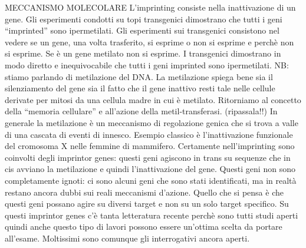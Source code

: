 \documentclass[11pt]{book}
\begin{document}
MECCANISMO MOLECOLARE
L’imprinting consiste nella inattivazione di un gene.
Gli esperimenti condotti su topi transgenici dimostrano che tutti i geni “imprinted” sono ipermetilati. Gli esperimenti sui transgenici consistono nel vedere se un gene, una volta trasferito, si esprime o non si esprime e perchè non si esprime. Se è un gene metilato non si esprime. I transgenici dimostrano in modo diretto e inequivocabile che tutti i geni imprinted sono ipermetilati.
NB: stiamo parlando di metilazione del DNA.
La metilazione spiega bene sia il silenziamento del gene sia il fatto che il gene inattivo resti tale nelle cellule derivate per mitosi da una cellula madre in cui è metilato. Ritorniamo al concetto della “memoria cellulare” e all’azione della metil-transferasi.  (ripassala!!)
In generale la metilazione è un meccanismo di regolazione genica che si trova a valle  di una cascata di eventi di innesco.
Esempio classico è l’inattivazione funzionale del cromosoma X nelle femmine di mammifero.
Certamente nell’imprinting sono coinvolti degli imprintor genes: questi geni agiscono in trans su sequenze che in cis avviano la metilazione e quindi l’inattivazione del gene. Questi geni non sono completamente ignoti: ci sono alcuni geni che sono stati identificati, ma in realtà restano ancora dubbi sui reali meccanismi d’azione. Quello che si pensa è che questi geni possano agire su diversi target e non su un solo target specifico. Su questi imprintor genes c’è tanta letteratura recente perchè sono tutti studi aperti quindi anche questo tipo di lavori possono essere un’ottima scelta da portare all’esame.
Moltissimi sono comunque gli interrogativi ancora aperti.
\end{document}
